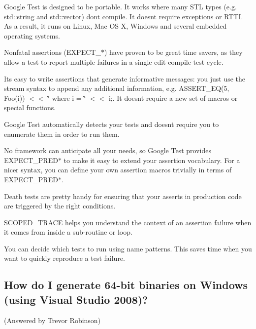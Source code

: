 \begin{DoxyItemize}
\item Google Test is designed to be portable. It works where many S\+TL types (e.\+g. {\ttfamily std\+::string} and {\ttfamily std\+::vector}) don\textquotesingle{}t compile. It doesn\textquotesingle{}t require exceptions or R\+T\+TI. As a result, it runs on Linux, Mac OS X, Windows and several embedded operating systems.
\item Nonfatal assertions ({\ttfamily E\+X\+P\+E\+C\+T\+\_\+$\ast$}) have proven to be great time savers, as they allow a test to report multiple failures in a single edit-\/compile-\/test cycle.
\item It\textquotesingle{}s easy to write assertions that generate informative messages\+: you just use the stream syntax to append any additional information, e.\+g. {\ttfamily A\+S\+S\+E\+R\+T\+\_\+\+E\+Q(5, Foo(i)) $<$$<$ \char`\"{} where i = \char`\"{} $<$$<$ i;}. It doesn\textquotesingle{}t require a new set of macros or special functions.
\item Google Test automatically detects your tests and doesn\textquotesingle{}t require you to enumerate them in order to run them.
\item No framework can anticipate all your needs, so Google Test provides {\ttfamily E\+X\+P\+E\+C\+T\+\_\+\+P\+R\+E\+D$\ast$} to make it easy to extend your assertion vocabulary. For a nicer syntax, you can define your own assertion macros trivially in terms of {\ttfamily E\+X\+P\+E\+C\+T\+\_\+\+P\+R\+E\+D$\ast$}.
\item Death tests are pretty handy for ensuring that your asserts in production code are triggered by the right conditions.
\item {\ttfamily S\+C\+O\+P\+E\+D\+\_\+\+T\+R\+A\+CE} helps you understand the context of an assertion failure when it comes from inside a sub-\/routine or loop.
\item You can decide which tests to run using name patterns. This saves time when you want to quickly reproduce a test failure.
\end{DoxyItemize}

\subsection*{How do I generate 64-\/bit binaries on Windows (using Visual Studio 2008)?}

(Answered by Trevor Robinson)

